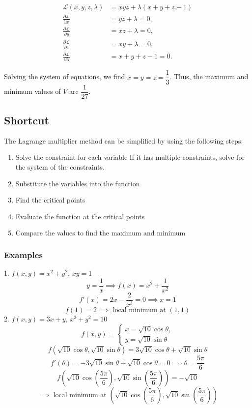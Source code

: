 \begin{align*}
    \mathcal{L}(x, y, z, \lambda) &= xyz + \lambda(x + y + z - 1)\\
    \frac{\partial \mathcal{L}}{\partial x} &= yz + \lambda = 0,\\
    \frac{\partial \mathcal{L}}{\partial y} &= xz + \lambda = 0,\\
    \frac{\partial \mathcal{L}}{\partial z} &= xy + \lambda = 0,\\
    \frac{\partial \mathcal{L}}{\partial \lambda} &= x + y + z - 1 = 0.
\end{align*}

Solving the system of equations, we find \(x = y = z = \dfrac{1}{3}\). Thus, the maximum and minimum values of \(V\) are \(\dfrac{1}{27}\).

\subsection{Shortcut}
The Lagrange multiplier method can be simplified by using the following steps:
\begin{enumerate}
    \item Solve the constraint for each variable
    \subitem If it has multiple constraints, solve for the system of the constraints.
    \item Substitute the variables into the function
    \item Find the critical points
    \item Evaluate the function at the critical points
    \item Compare the values to find the maximum and minimum
\end{enumerate}

\subsubsection{Examples}
1. $f(x, y) = x^2 + y^2$, $xy = 1$
\[
    y = \dfrac{1}{x} \implies f(x) = x^2 + \dfrac{1}{x^2}
\]
\[
    f'(x) = 2x - \dfrac{2}{x^3} = 0 \implies x = 1
\]
\[
    f(1) = 2 \implies \text{ local minimum at } (1, 1)
\]
2. $f(x, y) = 3x + y$, $x^2 + y^2 = 10$
\[
    f(x, y) =
    \begin{cases}
        x = \sqrt{10}\cos\theta,\\
        y = \sqrt{10}\sin\theta
    \end{cases}
\]
\[
    f(\sqrt{10}\cos\theta, \sqrt{10}\sin\theta) = 3\sqrt{10}\cos\theta + \sqrt{10}\sin\theta
\]
\[
    f'(\theta) = -3\sqrt{10}\sin\theta + \sqrt{10}\cos\theta = 0 \implies \theta = \dfrac{5\pi}{6}
\]
\[
    f\left(\sqrt{10}\cos\left(\dfrac{5\pi}{6}\right), \sqrt{10}\sin\left(\dfrac{5\pi}{6}\right)\right) = -\sqrt{10} 
\]
\[
    \implies \text{ local minimum at } \left(\sqrt{10}\cos\left(\dfrac{5\pi}{6}\right), \sqrt{10}\sin\left(\dfrac{5\pi}{6}\right)\right)
\]